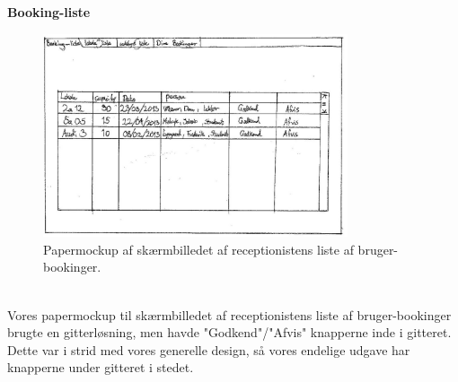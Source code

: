 \textbf{Booking-liste}
\begin{figure}[h!]
  \centering
    \includegraphics[width=0.8\textwidth]{Appendix/GUI-Prototype/PaperMockup/GodkendBookinger_001}
  \caption{Papermockup af skærmbilledet af receptionistens liste af bruger-bookinger.}
\label{Design_G_Development_AendreLokale_Final}
\end{figure} 
\\Vores papermockup til skærmbilledet af receptionistens liste af bruger-bookinger brugte en gitterløsning, men havde "Godkend"/"Afvis" knapperne inde i gitteret. Dette var i strid med vores generelle design, så vores endelige udgave har knapperne under gitteret i stedet.